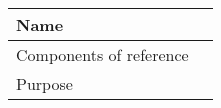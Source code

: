 \begin{table}[H]
    \label{T1}
    \begin{tabularx}{\textwidth}{l|X}
        \hline
        Name
        & 
         
        \\ \hline
        Components of reference 
        & 
         
        \\ \hline
        Purpose
        & 
         
        \\ \hline
    \end{tabularx}
\end{table}